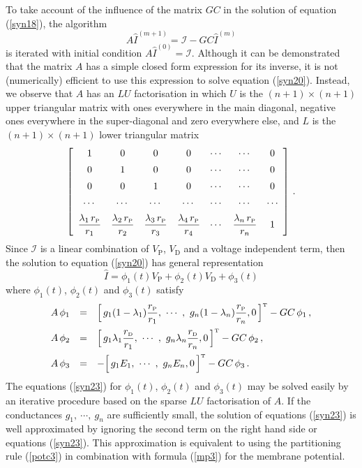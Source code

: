 To take account of the influence of the matrix $GC$ in the
solution of equation (\ref{syn18}), the algorithm
\begin{equation}\label{syn20}
A\widehat{I}^{(m+1)}=\mathcal{I}-GC\widehat{I}^{(m)}
\end{equation}
is iterated with initial condition
$A\widehat{I}^{(0)}=\mathcal{I}$. Although it can be demonstrated
that the matrix $A$ has a simple closed form expression for its
inverse, it is not (numerically) efficient to use this expression
to solve equation (\ref{syn20}). Instead, we observe that $A$ has
an $LU$ factorisation in which $U$ is the $(n+1)\times(n+1)$ upper
triangular matrix with ones everywhere in the main diagonal,
negative ones everywhere in the super-diagonal and zero everywhere
else, and $L$ is the $(n+1)\times(n+1)$ lower triangular matrix
\begin{equation}\label{syn21}
\left[\begin{array}{ccccccc}
1 & 0 & 0 & 0 & \cdots & \cdots & 0 \\[5pt]
0 & 1 & 0 & 0 & \cdots & \cdots & 0 \\[5pt]
0 & 0 & 1 & 0 & \cdots & \cdots & 0 \\[5pt]
\cdots & \cdots & \cdots & \cdots & \cdots & \cdots & \cdots \\[5pt]
\displaystyle\frac{\lambda_1\,r_{\mbox{\tiny P}}}{r_1} &
\displaystyle\frac{\lambda_2\,r_{\mbox{\tiny P}}}{r_2} &
\displaystyle\frac{\lambda_3\,r_{\mbox{\tiny P}}}{r_3} &
\displaystyle\frac{\lambda_4\,r_{\mbox{\tiny P}}}{r_4} & \cdots &
\displaystyle\frac{\lambda_n\,r_{\mbox{\tiny P}}}{r_n} & 1
\end{array}\right]\,.
\end{equation}
Since $\mathcal{I}$ is a linear combination of $V_\mathrm{P}$,
$V_\mathrm{D}$ and a voltage independent term, then the solution
to equation (\ref{syn20}) has general representation
\begin{equation}\label{syn22}
\widehat{I} = \phi_1(t)V_\mathrm{P} +
\phi_2(t)V_\mathrm{D}+\phi_3(t)
\end{equation}
where $\phi_1(t)$, $\phi_2(t)$ and $\phi_3(t)$ satisfy
\begin{equation}\label{syn23}
\begin{array}{rcl}
A\,\phi_1 & = & \Big[\,g_1(1-\lambda_1)\ds\frac{r_\mathrm{P}}{r_1}
,\ \cdots \ ,\
g_n(1-\lambda_n)\ds\frac{r_\mathrm{P}}{r_n},0\,\Big]^\mathrm{T}
-GC\,\phi_1\,,\\[10pt]
A\,\phi_2 & = & \Big[\,g_1\lambda_1\ds\frac{r_\mathrm{D}}{r_1}
,\ \cdots \ ,\ g_n\lambda_n\ds\frac{r_\mathrm{D}}{r_n},0\,\Big]^\mathrm{T}-GC\,\phi_2\,,\\[10pt]
A\,\phi_3 & = & -\Big[\,g_1E_1,\ \cdots \ ,\
g_nE_n,0\,\Big]^\mathrm{T}-GC\,\phi_3\,.
\end{array}
\end{equation}
The equations (\ref{syn23}) for $\phi_1(t)$, $\phi_2(t)$ and
$\phi_3(t)$ may be solved easily by an iterative procedure based
on the sparse $LU$ factorisation of $A$. If the conductances
$g_1,\ \cdots ,\ g_n$ are sufficiently small, the solution of
equations (\ref{syn23}) is well approximated by ignoring the
second term on the right hand side or equations (\ref{syn23}).
This approximation is equivalent to using the partitioning rule
(\ref{potc3}) in combination with formula (\ref{mp3}) for the
membrane potential.

